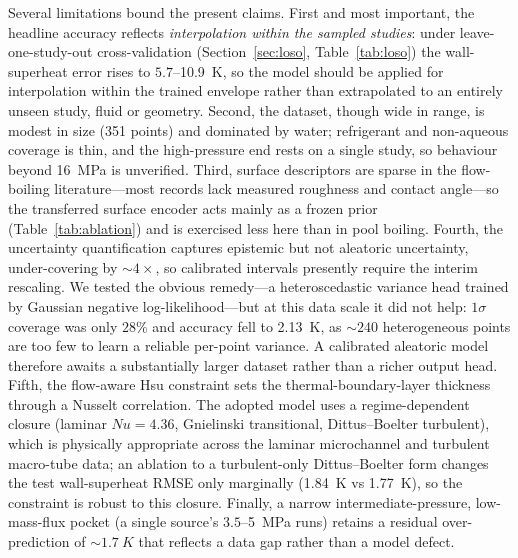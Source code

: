 Several limitations bound the present claims. First and most important, the
headline accuracy reflects \emph{interpolation within the sampled studies}:
under leave-one-study-out cross-validation (Section~\ref{sec:loso},
Table~\ref{tab:loso}) the wall-superheat error rises to $5.7$--\SI{10.9}{K}, so
the model should be applied for interpolation within the trained envelope rather
than extrapolated to an entirely unseen study, fluid or geometry. Second, the
dataset, though wide in range, is modest in size (351 points) and dominated by
water; refrigerant and non-aqueous coverage is thin, and the high-pressure end
rests on a single study, so behaviour beyond \SI{16}{MPa} is unverified. Third,
surface descriptors are sparse in the flow-boiling literature---most records
lack measured roughness and contact angle---so the transferred surface encoder
acts mainly as a frozen prior (Table~\ref{tab:ablation}) and is exercised less
here than in pool boiling. Fourth, the uncertainty quantification captures
epistemic but not aleatoric uncertainty, under-covering by $\sim\!4\times$, so
calibrated intervals presently require the interim rescaling. We tested the
obvious remedy---a heteroscedastic variance head trained by Gaussian negative
log-likelihood---but at this data scale it did not help: $1\sigma$ coverage was
only $28\%$ and accuracy fell to \SI{2.13}{K}, as $\sim\!240$ heterogeneous
points are too few to learn a reliable per-point variance. A calibrated
aleatoric model therefore awaits a substantially larger dataset rather than a
richer output head.
Fifth, the flow-aware Hsu constraint sets the thermal-boundary-layer thickness
through a Nusselt correlation. The adopted model uses a regime-dependent closure
(laminar $Nu=4.36$, Gnielinski transitional, Dittus--Boelter turbulent), which is
physically appropriate across the laminar microchannel and turbulent macro-tube
data; an ablation to a turbulent-only Dittus--Boelter form changes the test
wall-superheat RMSE only marginally (\SI{1.84}{K} vs \SI{1.77}{K}), so the
constraint is robust to this closure. Finally, a narrow intermediate-pressure,
low-mass-flux pocket (a single source's
$3.5$--\SI{5}{MPa} runs) retains a residual over-prediction of
$\sim\!\SI{1.7}{K}$ that reflects a data gap rather than a model defect.
